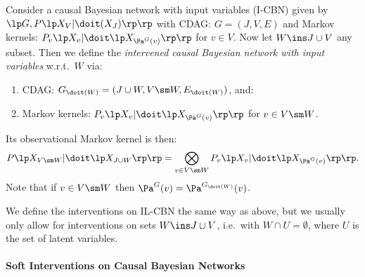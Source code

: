 \begin{Def}
    Consider a causal Bayesian network with input variables (I-CBN) given by $\lp G, P\lp X_V|\doit(X_J)\rp\rp$ 
    with CDAG: $G=(J,V,E)$ and Markov kernels: $P_v\lp X_v|\doit\lp X_{\Pa^G(v)}\rp\rp$ for $v \in V$.
    Now let  $ W \ins J \cup V$ any subset.
    Then we define the \emph{intervened causal Bayesian network with input variables} w.r.t.\ $W$ via:
    \begin{enumerate}
        \item CDAG: $G_{\doit(W)} = (J \cup W, V \sm W, E_{\doit(W)}) $, and:
        \item Markov kernels: $P_v\lp X_v|\doit\lp X_{\Pa^G(v)}\rp\rp$ for $v \in V \sm W$.
    \end{enumerate}
    Its observational Markov kernel is then:
    \[ P\lp X_{V \sm W}|\doit\lp X_{J \cup W}\rp\rp = \bigotimes_{v \in V\sm W} P_v\lp X_v|\doit\lp X_{\Pa^G(v)}\rp\rp.  \]
    Note that if $ v\in V \sm W$ then $\Pa^G(v) = \Pa^{G_{\doit(W)}}(v)$.
\end{Def}

\begin{Rem}
We define the interventions on IL-CBN the same way as above, but we usually 
only allow for interventions on sets $W \ins J \cup V$, i.e.\ with $W \cap U = \emptyset$, where $U$ is the set of latent variables.
\end{Rem}

\paragraph{Soft Interventions on Causal Bayesian Networks}

